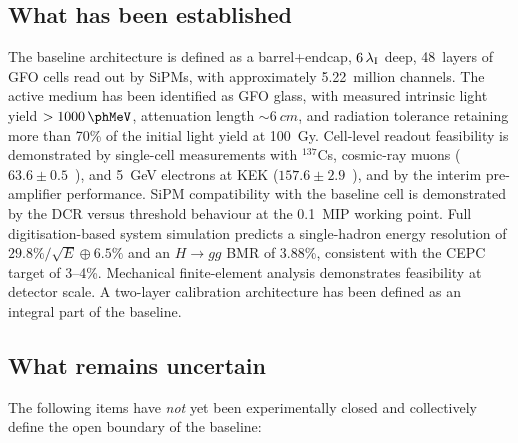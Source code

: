 \subsection{What has been established}
\label{subsec:established}

The baseline architecture is defined as a barrel+endcap,
$6\,\lambda_{\mathrm{I}}$ deep, 48~layers of \cellsize GFO cells read out by
\sipmsize SiPMs, with approximately 5.22~million channels.
The active medium has been identified as GFO glass, with measured
intrinsic light yield $>\SI{1000}{\phMeV}$, attenuation length
${\sim}\SI{6}{cm}$, and radiation tolerance retaining more than 70\%
of the initial light yield at \SI{100}{Gy}.
Cell-level readout feasibility is demonstrated by single-cell
measurements with $^{137}$Cs, cosmic-ray muons
(${63.6\pm0.5}$~\peMIP), and \SI{5}{GeV} electrons at KEK
(${157.6\pm2.9}$~\peMIP), and by the interim pre-amplifier
performance.
SiPM compatibility with the baseline cell is demonstrated by the DCR
versus threshold behaviour at the \SI{0.1}{MIP} working point.
Full digitisation-based system simulation predicts a single-hadron
energy resolution of $29.8\%/\sqrt{E}\oplus6.5\%$ and an $H\to gg$
BMR of 3.88\%, consistent with the CEPC target of 3--4\%.
Mechanical finite-element analysis demonstrates feasibility at
detector scale.
A two-layer calibration architecture has been defined as an integral
part of the baseline.

\subsection{What remains uncertain}
\label{subsec:uncertain}

The following items have \emph{not} yet been experimentally closed
and collectively define the open boundary of the baseline:

